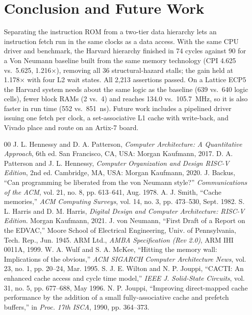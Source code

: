 \documentclass[conference]{IEEEtran}
\begin{document}
\section{Conclusion and Future Work}
Separating the instruction ROM from a two-tier data hierarchy lets an instruction fetch run in the same clocks as a data access. With the same CPU driver and benchmark, the Harvard hierarchy finished in 74 cycles against 90 for a Von Neumann baseline built from the same memory technology (CPI 4.625 vs.\ 5.625, 1.216$\times$), removing all 36 structural-hazard stalls; the gain held at 1.178$\times$ with four L2 wait states. All 2,213 assertions passed. On a Lattice ECP5 the Harvard system needs about the same logic as the baseline (639 vs.\ 640 logic cells), fewer block RAMs (2 vs.\ 4) and reaches 134.0 vs.\ 105.7~MHz, so it is also faster in run time (552 vs.\ 851~ns). Future work includes a pipelined driver issuing one fetch per clock, a set-associative L1 cache with write-back, and Vivado place and route on an Artix-7 board.

\begin{thebibliography}{00}
 J. L. Hennessy and D. A. Patterson, \emph{Computer Architecture: A Quantitative Approach}, 6th ed. San Francisco, CA, USA: Morgan Kaufmann, 2017.
 D. A. Patterson and J. L. Hennessy, \emph{Computer Organization and Design RISC-V Edition}, 2nd ed. Cambridge, MA, USA: Morgan Kaufmann, 2020.
 J. Backus, ``Can programming be liberated from the von Neumann style?'' \emph{Communications of the ACM}, vol. 21, no. 8, pp. 613--641, Aug. 1978.
 A. J. Smith, ``Cache memories,'' \emph{ACM Computing Surveys}, vol. 14, no. 3, pp. 473--530, Sept. 1982.
 S. L. Harris and D. M. Harris, \emph{Digital Design and Computer Architecture: RISC-V Edition}. Morgan Kaufmann, 2021.
 J. von Neumann, ``First Draft of a Report on the EDVAC,'' Moore School of Electrical Engineering, Univ. of Pennsylvania, Tech. Rep., Jun. 1945.
 ARM Ltd., \emph{AMBA Specification (Rev 2.0)}, ARM IHI 0011A, 1999.
 W. A. Wulf and S. A. McKee, ``Hitting the memory wall: Implications of the obvious,'' \emph{ACM SIGARCH Computer Architecture News}, vol. 23, no. 1, pp. 20--24, Mar. 1995.
 S. J. E. Wilton and N. P. Jouppi, ``CACTI: An enhanced cache access and cycle time model,'' \emph{IEEE J. Solid-State Circuits}, vol. 31, no. 5, pp. 677--688, May 1996.
 N. P. Jouppi, ``Improving direct-mapped cache performance by the addition of a small fully-associative cache and prefetch buffers,'' in \emph{Proc. 17th ISCA}, 1990, pp. 364--373.
\end{thebibliography}
\end{document}
